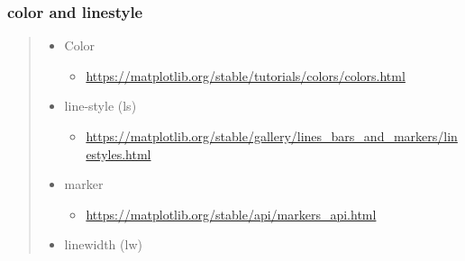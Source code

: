 \documentclass[
]{book}
\providecommand{\tightlist}{%
  \setlength{\itemsep}{0pt}\setlength{\parskip}{0pt}}
\theoremstyle{definition}
\theoremstyle{definition}
\theoremstyle{definition}
\theoremstyle{definition}
\theoremstyle{remark}
\begin{document}
\subsubsection{color and linestyle}\label{color-and-linestyle}

\begin{quote}
\begin{itemize}
\tightlist
\item
  Color

  \begin{itemize}
  \tightlist
  \item
    \url{https://matplotlib.org/stable/tutorials/colors/colors.html}
  \end{itemize}
\item
  line-style (ls)

  \begin{itemize}
  \tightlist
  \item
    \url{https://matplotlib.org/stable/gallery/lines_bars_and_markers/linestyles.html}
  \end{itemize}
\item
  marker

  \begin{itemize}
  \tightlist
  \item
    \url{https://matplotlib.org/stable/api/markers_api.html}
  \end{itemize}
\item
  linewidth (lw)
\end{itemize}
\end{quote}
\end{document}
